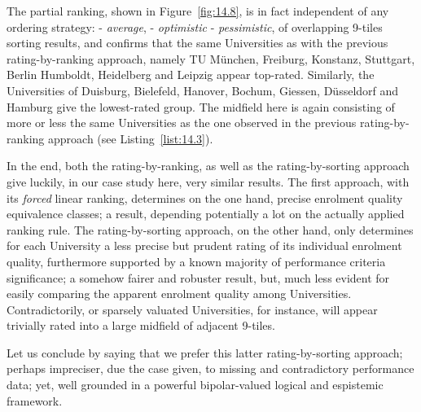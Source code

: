 The partial ranking, shown in Figure~\vref{fig:14.8}, is in fact independent of any ordering strategy: - \emph{average}, - \emph{optimistic} - \emph{pessimistic}, of overlapping 9-tiles sorting results, and confirms that the same Universities as with the previous rating-by-ranking approach, namely TU München, Freiburg, Konstanz, Stuttgart, Berlin Humboldt, Heidelberg and Leipzig appear top-rated. Similarly, the Universities of Duisburg, Bielefeld, Hanover, Bochum, Giessen, Düsseldorf and Hamburg give the lowest-rated group. The midfield here is again consisting of more or less the same Universities as the one observed in the previous rating-by-ranking approach (see Listing~\vref{list:14.3}).

In the end, both the \Copeland rating-by-ranking, as well as the rating-by-sorting approach give luckily, in our case study here, very similar results. The first approach, with its \emph{forced} linear ranking, determines on the one hand, precise enrolment quality equivalence classes; a result, depending potentially a lot on the actually applied ranking rule. The rating-by-sorting approach, on the other hand, only determines for each University a less precise but prudent rating of its individual enrolment quality, furthermore supported by a known majority of performance criteria significance; a somehow fairer and robuster result, but, much less evident for easily comparing the apparent enrolment quality among Universities. Contradictorily, or sparsely valuated Universities, for instance, will appear trivially rated into a large midfield of adjacent 9-tiles.

Let us conclude by saying that we prefer this latter rating-by-sorting approach; perhaps impreciser, due the case given, to missing and contradictory performance data; yet, well grounded in a powerful bipolar-valued logical and espistemic framework.
 
\clearpage


%